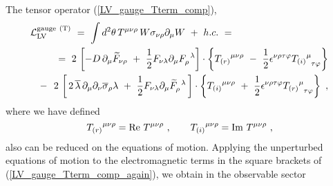 \documentclass[a4paper,12pt]{article}
\begin{document}
	The tensor operator (\ref{LV_gauge_Tterm_comp}),
\begin{eqnarray}
\nonumber
\lefteqn{
	\mathcal{L}_{\mathrm{LV}}^{\mathrm{gauge\ (T)}}  ~=~ 
	\int d^2\theta \, T^{\mu\nu\rho} \,
	        W \sigma_{\nu\rho} \partial_\mu W  ~+~ h.c. ~=~ } \\
\label{LV_gauge_Tterm_comp_again}
        &&
        =~
	2\,
	\left[
	   - D\, \partial_\mu \widetilde{F}_{\nu\rho} 
	   ~+~
	   \frac{1}{2}
	   F_{\nu\lambda}\partial_\mu F_\rho^{\phantom{\rho}\lambda}
	\right] 
	\cdot
	\left\{
	{T_{(r)}}^{\mu\nu\rho} 
	~-~
	\frac{1}{2} \epsilon^{\nu\rho\tau\varphi}
	{T_{(i)}}^\mu_{\phantom{\mu}\tau\varphi}
	\right\}
	\\
\nonumber
        &&
        -~~
	2\,
	\left[\,
	    2\, \overline{\lambda}\, \partial_\mu \partial_\nu
	    \overline{\sigma}_\rho \lambda
	    ~+~
	    \frac{1}{2} F_{\nu\lambda} \partial_\mu
	    \widetilde{F}_\rho^{\phantom{\rho}\lambda}
	    \,
	\right]
	\cdot
	\left\{
	   {T_{(i)}}^{\mu\nu\rho} 
	   ~+~
	   \frac{1}{2} \epsilon^{\nu\rho\tau\varphi}
	   {T_{(r)}}^\mu_{\phantom{\mu}\tau\varphi}
	\right\}~,
\end{eqnarray}
        where we have defined
\begin{equation}
\nonumber
 	{T_{(r)}}^{\mu\nu\rho}  =  {\rm Re}~ T^{\mu\nu\rho}~, 
	\qquad
 	{T_{(i)}}^{\mu\nu\rho}  =  {\rm Im}~ T^{\mu\nu\rho}~, 
\end{equation}
        also can be reduced on the equations of motion.
	Applying the unperturbed equations of motion to the 
	electromagnetic terms in the square brackets of 
	(\ref{LV_gauge_Tterm_comp_again}), we obtain in the
	observable sector
\end{document}
